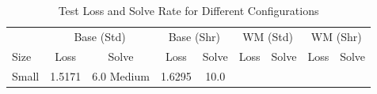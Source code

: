 \begin{table}[t]
\centering
\caption{Test Loss and Solve Rate for Different Configurations}
\begin{tabular}{l|cc|cc|cc|cc}
\hline
& \multicolumn{2}{c|}{Base (Std)} & \multicolumn{2}{c|}{Base (Shr)} & \multicolumn{2}{c|}{WM (Std)} & \multicolumn{2}{c}{WM (Shr)} \\
Size & Loss & Solve & Loss & Solve & Loss & Solve & Loss & Solve \\
\hline
Small & 1.5171 & 6.0%
Medium & 1.6295 & 10.0%
\hline
\end{tabular}
\end{table}
